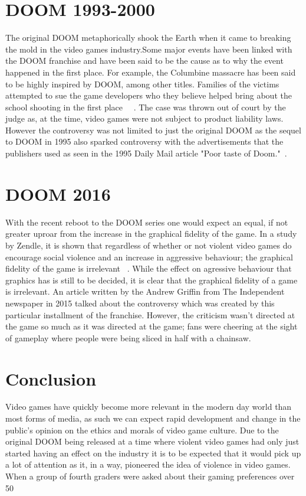 \documentclass[12pt]{article}
\begin{document}
\section{DOOM 1993-2000}
The original DOOM metaphorically shook the Earth when it came to breaking the mold in the video games industry.Some major events have been linked with the DOOM franchise and have been said to be the cause as to why the event happened in the first place. For example, the Columbine massacre has been said to be highly inspired by DOOM, among other titles. Families of the victims attempted to sue the game developers who they believe helped bring about the school shooting in the first place~\cite{bbc1} ~\cite{bbc2}. The case was thrown out of court by the judge as, at the time, video games were not subject to product liability laws.
However the controversy was not limited to just the original DOOM as the sequel to DOOM in 1995 also sparked controversy with the advertisements that the publishers used as seen in the 1995 Daily Mail article "Poor taste of Doom."~\cite{dailymail}. 

\section{DOOM 2016}
With the recent reboot to the DOOM series one would expect an equal, if not greater uproar from the increase in the graphical fidelity of the game. 
In a study by Zendle, it is shown that regardless of whether or not violent video games do encourage social violence and an increase in aggressive behaviour; the graphical fidelity of the game is irrelevant ~\cite{Zendle:2015:HGF:2793107.2793113}. While the effect on agressive behaviour that graphics has is still to be decided, it is clear that the graphical fidelity of a game is irrelevant.
An article written by the Andrew Griffin from The Independent newspaper in 2015 talked about the controversy which was created by this particular installment of the franchise. However, the criticism wasn't directed at the game so much as it was directed at the game; fans were cheering at the sight of gameplay where people were being sliced in half with a chainsaw. 
~\vspace{5mm}

\section{Conclusion}
Video games have quickly become more relevant in the modern day world than most forms of media, as such we can expect rapid development and change in the public's opinion on the ethics and morals of video game culture. Due to the original DOOM being released at a time where violent video games had only just started having an effect on the industry it is to be expected that it would pick up a lot of attention as it, in a way, pioneered the idea of violence in video games. When a group of fourth graders were asked about their gaming preferences over 50%




\end{document}
